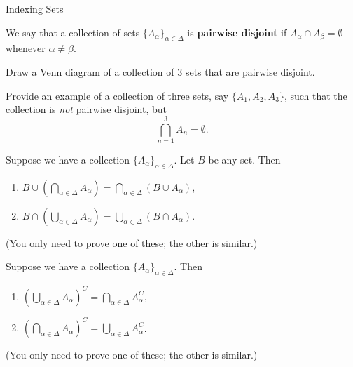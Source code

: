 \begin{section}{Indexing Sets}
\begin{definition}
We say that a collection of sets $\{A_{\alpha}\}_{\alpha\in\Delta}$ is \textbf{pairwise disjoint} if $A_{\alpha} \cap A_{\beta}=\emptyset$ whenever $\alpha\neq \beta$.
\end{definition}

\begin{exercise}
Draw a Venn diagram of a collection of 3 sets that are pairwise disjoint.
\end{exercise}

\begin{exercise}
Provide an example of a collection of three sets, say $\{A_1, A_2, A_3\}$, such that the collection is \emph{not} pairwise disjoint, but 
\[
\bigcap_{n=1}^3 A_n=\emptyset.
\]
\end{exercise}

\begin{theorem}
Suppose we have a collection $\{A_{\alpha}\}_{\alpha\in\Delta}$.  Let $B$ be any set.  Then
\begin{enumerate}
\item $\displaystyle B \cup \left(\bigcap_{\alpha\in\Delta}A_{\alpha}\right)=\bigcap_{\alpha\in\Delta}(B\cup A_{\alpha})$,
\item $\displaystyle B \cap \left(\bigcup_{\alpha\in\Delta}A_{\alpha}\right)=\bigcup_{\alpha\in\Delta}(B\cap A_{\alpha})$.
\end{enumerate}
(You only need to prove one of these; the other is similar.)
\end{theorem}

\begin{theorem}
Suppose we have a collection $\{A_{\alpha}\}_{\alpha\in\Delta}$.  Then
\begin{enumerate}
\item $\displaystyle \left(\bigcup_{\alpha\in\Delta} A_{\alpha}\right)^C=\bigcap_{\alpha\in\Delta}A_{\alpha}^{C}$,
\item $\displaystyle \left(\bigcap_{\alpha\in\Delta} A_{\alpha}\right)^C=\bigcup_{\alpha\in\Delta}A_{\alpha}^{C}$.
\end{enumerate}
(You only need to prove one of these; the other is similar.)
\end{theorem}

\end{section}

